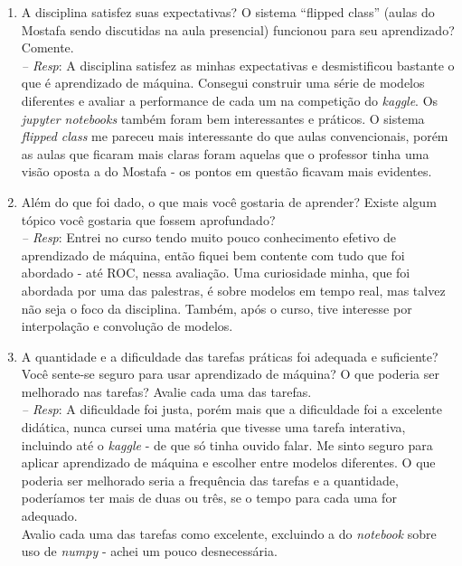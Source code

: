 \documentclass[12pt]{article}
\begin{document}
\begin{enumerate}
\begin{enumerate}
		\item A disciplina satisfez suas expectativas? O sistema ``flipped class'' (aulas do Mostafa sendo
		discutidas na aula presencial) funcionou para seu aprendizado? Comente.\\
		\textit{-- Resp}: A disciplina satisfez as minhas expectativas e desmistificou bastante o que é aprendizado de máquina. Consegui construir uma série de modelos diferentes e avaliar a performance de cada um na competição do \textit{kaggle}. Os \textit{jupyter notebooks} também foram bem interessantes e práticos. O sistema \textit{flipped class} me pareceu mais interessante do que aulas convencionais, porém as aulas que ficaram mais claras foram aquelas que o professor tinha uma visão oposta a do Mostafa - os pontos em questão ficavam mais evidentes.\\
		
		\item Além do que foi dado, o que mais você gostaria de aprender? Existe algum tópico você gostaria 
		que fossem aprofundado?\\
		\textit{-- Resp}: Entrei no curso tendo muito pouco conhecimento efetivo de aprendizado de máquina, então fiquei bem contente com tudo que foi abordado - até ROC, nessa avaliação. Uma curiosidade minha, que foi abordada por uma das palestras, é sobre modelos em tempo real, mas talvez não seja o foco da disciplina. Também, após o curso, tive interesse por interpolação e convolução de modelos.\\
				
		\item A quantidade e a dificuldade das tarefas práticas foi adequada e suficiente? Você
		  sente-se seguro para usar aprendizado de máquina? O que poderia ser melhorado nas 
		tarefas? Avalie cada uma das tarefas.\\
		\textit{-- Resp}: A dificuldade foi justa, porém mais que a dificuldade foi a excelente didática, nunca cursei uma matéria que tivesse uma tarefa interativa, incluindo até o \textit{kaggle} - de que só tinha ouvido falar. Me sinto seguro para aplicar aprendizado de máquina e escolher entre modelos diferentes. O que poderia ser melhorado seria a frequência das tarefas e a quantidade, poderíamos ter mais de duas ou três, se o tempo para cada uma for adequado.\\
		Avalio cada uma das tarefas como excelente, excluindo a do \textit{notebook} sobre uso de \textit{numpy} - achei um pouco desnecessária.\\
				

\end{enumerate}
\end{enumerate}
\end{document}
